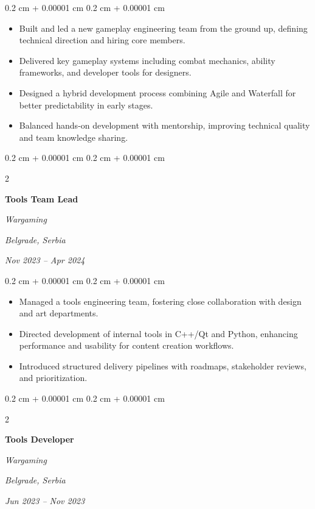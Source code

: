 \documentclass[10pt, letterpaper]{article}
\newenvironment{highlights}{
    \begin{itemize}[
        topsep=0.10 cm,
        parsep=0.10 cm,
        partopsep=0pt,
        itemsep=0pt,
        leftmargin=0.4 cm + 10pt
    ]
}{
    \end{itemize}
} %
\newenvironment{onecolentry}{
    \begin{adjustwidth}{
        0.2 cm + 0.00001 cm
    }{
        0.2 cm + 0.00001 cm
    }
}{
    \end{adjustwidth}
} %
\newenvironment{twocolentry}[2][]{
    \onecolentry
    \def\secondColumn{#2}
    \setcolumnwidth{\fill, 4.5 cm}
    \begin{paracol}{2}
}{
    \switchcolumn \raggedleft \secondColumn
    \end{paracol}
    \endonecolentry
} %
\begin{document}
        \vspace{0.10 cm}
        \begin{onecolentry}
            \begin{highlights}
                \item Built and led a new gameplay engineering team from the ground up, defining technical direction and hiring core members.
                \item Delivered key gameplay systems including combat mechanics, ability frameworks, and developer tools for designers.
                \item Designed a hybrid development process combining Agile and Waterfall for better predictability in early stages.
                \item Balanced hands-on development with mentorship, improving technical quality and team knowledge sharing.
            \end{highlights}
        \end{onecolentry}


        \vspace{0.3 cm}

\begin{twocolentry}{
        \textit{Belgrade, Serbia}    
            
        \textit{Nov 2023 – Apr 2024}}
            \textbf{Tools Team Lead}
            
            \textit{Wargaming}
        \end{twocolentry}

        \vspace{0.10 cm}
        \begin{onecolentry}
            \begin{highlights}
                \item Managed a tools engineering team, fostering close collaboration with design and art departments.
                \item Directed development of internal tools in C++/Qt and Python, enhancing performance and usability for content creation workflows.
                \item Introduced structured delivery pipelines with roadmaps, stakeholder reviews, and prioritization.
            \end{highlights}
        \end{onecolentry}


        \vspace{0.3 cm}


\begin{twocolentry}{
        \textit{Belgrade, Serbia}    
            
        \textit{Jun 2023 – Nov 2023}}
            \textbf{Tools Developer}
            
            \textit{Wargaming}
        \end{twocolentry}
\end{document}
